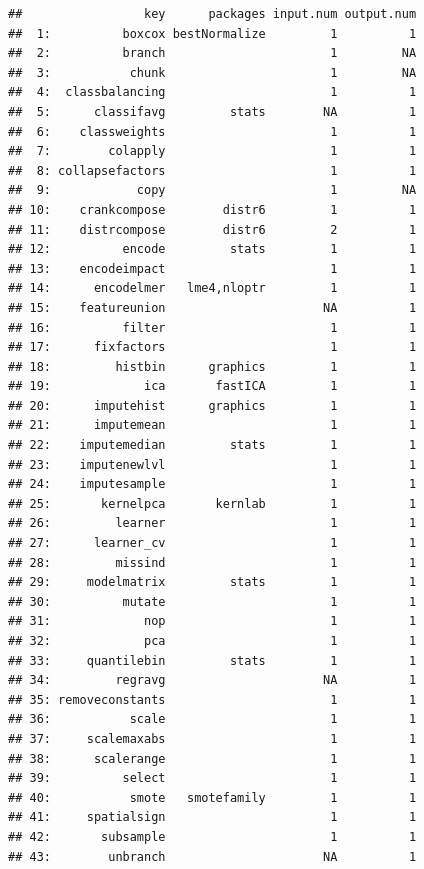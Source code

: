 \documentclass[]{article}
\begin{document}
\begin{verbatim}
##                 key      packages input.num output.num
##  1:          boxcox bestNormalize         1          1
##  2:          branch                       1         NA
##  3:           chunk                       1         NA
##  4:  classbalancing                       1          1
##  5:      classifavg         stats        NA          1
##  6:    classweights                       1          1
##  7:        colapply                       1          1
##  8: collapsefactors                       1          1
##  9:            copy                       1         NA
## 10:    crankcompose        distr6         1          1
## 11:    distrcompose        distr6         2          1
## 12:          encode         stats         1          1
## 13:    encodeimpact                       1          1
## 14:      encodelmer   lme4,nloptr         1          1
## 15:    featureunion                      NA          1
## 16:          filter                       1          1
## 17:      fixfactors                       1          1
## 18:         histbin      graphics         1          1
## 19:             ica       fastICA         1          1
## 20:      imputehist      graphics         1          1
## 21:      imputemean                       1          1
## 22:    imputemedian         stats         1          1
## 23:    imputenewlvl                       1          1
## 24:    imputesample                       1          1
## 25:       kernelpca       kernlab         1          1
## 26:         learner                       1          1
## 27:      learner_cv                       1          1
## 28:         missind                       1          1
## 29:     modelmatrix         stats         1          1
## 30:          mutate                       1          1
## 31:             nop                       1          1
## 32:             pca                       1          1
## 33:     quantilebin         stats         1          1
## 34:         regravg                      NA          1
## 35: removeconstants                       1          1
## 36:           scale                       1          1
## 37:     scalemaxabs                       1          1
## 38:      scalerange                       1          1
## 39:          select                       1          1
## 40:           smote   smotefamily         1          1
## 41:     spatialsign                       1          1
## 42:       subsample                       1          1
## 43:        unbranch                      NA          1

\end{verbatim}
\end{document}

